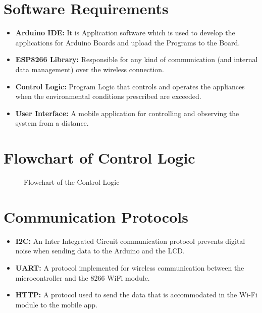 \documentclass[a4paper,12pt]{article}
\begin{document}
\section{Software Requirements}
\begin{itemize}
    \item \textbf{Arduino IDE:} It is Application software which is used to develop the applications for Arduino Boards and upload the Programs to the Board.
    \item \textbf{ESP8266 Library:} Responsible for any kind of communication (and internal data management) over the wireless connection.
    \item \textbf{Control Logic:}  Program Logic that controls and operates the appliances when the environmental conditions prescribed are exceeded.
    \item \textbf{User Interface:} A mobile application for controlling and observing the system from a distance.
\end{itemize}

\section{Flowchart of Control Logic}
\begin{figure}[H]
\centering
{}
\caption{Flowchart of the Control Logic}
\label{fig:flowchart}
\end{figure}

\section{Communication Protocols}
\begin{itemize}
    \item \textbf{I2C:} An Inter Integrated Circuit communication protocol prevents digital noise when sending data to the Arduino and the LCD.
    \item \textbf{UART:} A protocol implemented for wireless communication between the microcontroller and the 8266 WiFi module.
    \item \textbf{HTTP:} A protocol used to send the data that is accommodated in the Wi-Fi module to the mobile app.
\end{itemize}
\end{document}
